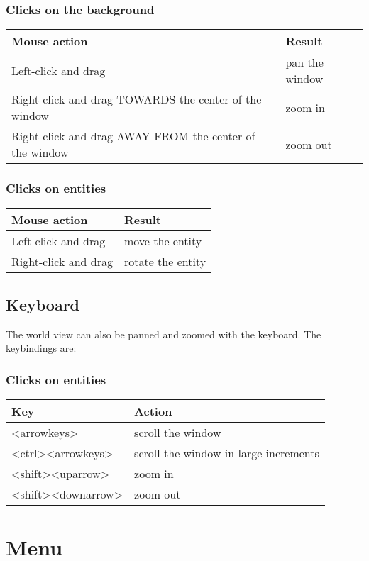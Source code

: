 \documentclass[11pt]{report}
\begin{document}
\subsubsection*{Clicks on the background}

\begin{tabular}{|l|l|}
\hline Mouse action & Result\\\hline
Left-click and drag & pan the window\\
Right-click and drag TOWARDS the center of the window & zoom in\\
Right-click and drag AWAY FROM the center of the window & zoom out\\ 
\hline
\end{tabular}

\subsubsection*{Clicks on entities}
\begin{tabular}{|l|l|}
\hline Mouse action & Result\\\hline
Left-click and drag & move the entity\\
Right-click and drag & rotate the entity\\
\hline
\end{tabular}

\subsection{Keyboard}
The world view can also be panned and zoomed with the keyboard. The
keybindings are:

\subsubsection*{Clicks on entities}
\begin{tabular}{|l|l|}
\hline Key & Action\\ \hline
<arrowkeys>        & scroll the window \\
<ctrl><arrowkeys>  & scroll the window in large increments \\
<shift><uparrow>   & zoom in \\
<shift><downarrow> & zoom out \\
\hline 
\end{tabular}

\section{Menu}
\end{document}
